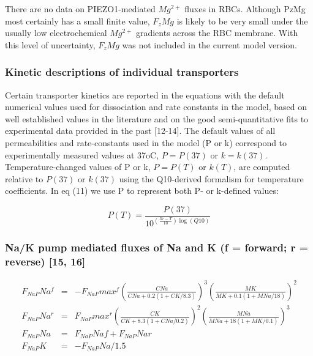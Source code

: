 \documentclass[a4paper]{article}
\newcommand{\med}[1]{M#1}
\newcommand{\cell}[1]{C#1}
\newcommand{\MNa}{\med{Na}}
\newcommand{\MK}{\med{K}}
\newcommand{\CNa}{\cell{Na}}
\newcommand{\CK}{\cell{K}}
\newcommand{\F}[2]{F_{#1}#2}
\begin{document}
There are no data on PIEZO1-mediated $Mg^{2+}$ fluxes in RBCs.  Although PzMg most certainly has a small finite value, $\F{z}{Mg}$ is likely to be very small under the usually low electrochemical $Mg^{2+}$ gradients across the RBC membrane.  With this level of uncertainty, $\F{z}{Mg}$ was not included in the current model version.  

\subsubsection{Kinetic descriptions of individual transporters}
Certain transporter kinetics are reported in the equations with the default numerical values used for dissociation and rate constants in the model, based on well established values in the literature and on the good semi-quantitative fits to experimental data provided in the past [12-14].  The default values of all permeabilities and rate-constants used in the model (P or k) correspond to experimentally measured values at 37oC, $P = P(37)$ or $k = k(37)$.  Temperature-changed values of P or k, $P = P(T)$ or $k(T)$, are computed relative to $P(37)$ or $k(37)$ using the Q10-derived formalism for temperature coefficients. In eq (11) we use P to represent both P- or k-defined values:

\setcounter{equation}{10}
\renewcommand{\theequation}{\arabic{equation}}
\begin{equation}
P(T)  =  \frac{P(37)}{10^{\left(\frac{37-T}{10}\right)\log(Q10)}}
\end{equation}
\setcounter{equation}{0}
\renewcommand{\theequation}{11.\alph{equation}}


\subsubsection{Na/K pump mediated fluxes of Na and K (f = forward; r = reverse) [15, 16]}

\begin{eqnarray}
\F{NaP}{Na}^f  &=& -\F{NaP}{max}^f\left(\frac{\CNa}{\CNa + 0.2(1 + \CK/8.3)}\right)^3 \left(\frac{\MK}{\MK + 0.1(1 + \MNa/18)}\right)^2 \\
\F{NaP}{Na}^r  &=& \F{NaP}{max}^r\left(\frac{\CK}{\CK + 8.3(1 + \CNa/0.2)}\right)^2\left(\frac{\MNa}{\MNa + 18(1 + \MK/0.1)}\right)^3 \\
\F{NaP}{Na} &=& \F{NaP}{Naf} + \F{NaP}{Nar} \\
\F{NaP}{K} &=& -\F{NaP}{Na}/1.5
\end{eqnarray}
\end{document}
